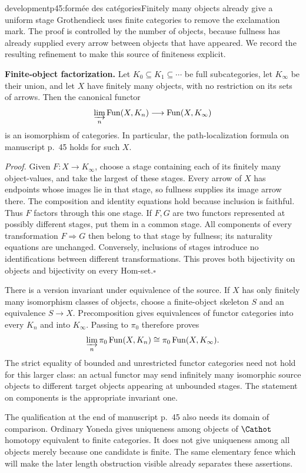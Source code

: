 \begin{dcomment}{development}{p45:formée des catégories}{Finitely many objects already give a uniform stage}
Grothendieck uses finite categories to remove the exclamation mark. The proof is controlled by the number of objects, because fullness has already supplied every arrow between objects that have appeared. We record the resulting refinement to make this source of finiteness explicit.

\textbf{Finite-object factorization.}\ours\quad
Let $K_0\subseteq K_1\subseteq\cdots$ be full subcategories, let $K_\infty$ be their union, and let $X$ have finitely many objects, with no restriction on its sets of arrows. Then the canonical functor
\[
 \varinjlim_n\operatorname{Fun}(X,K_n)
       \longrightarrow\operatorname{Fun}(X,K_\infty)
\]
is an isomorphism of categories. In particular, the path-localization formula on manuscript p.~45 holds for such $X$.

\textit{Proof.} Given $F:X\to K_\infty$, choose a stage containing each of its finitely many object-values, and take the largest of these stages. Every arrow of $X$ has endpoints whose images lie in that stage, so fullness supplies its image arrow there. The composition and identity equations hold because inclusion is faithful. Thus $F$ factors through this one stage. If $F,G$ are two functors represented at possibly different stages, put them in a common stage. All components of every transformation $F\Rightarrow G$ then belong to that stage by fullness; its naturality equations are unchanged. Conversely, inclusions of stages introduce no identifications between different transformations. This proves both bijectivity on objects and bijectivity on every Hom-set.\hfill$\square$

There is a version invariant under equivalence of the source. If $X$ has only finitely many isomorphism classes of objects, choose a finite-object skeleton $S$ and an equivalence $S\to X$. Precomposition gives equivalences of functor categories into every $K_n$ and into $K_\infty$. Passing to $\pi_0$ therefore proves
\[
 \varinjlim_n\pi_0\operatorname{Fun}(X,K_n)
       \cong\pi_0\operatorname{Fun}(X,K_\infty).
\]
The strict equality of bounded and unrestricted functor categories need not hold for this larger class: an actual functor may send infinitely many isomorphic source objects to different target objects appearing at unbounded stages. The statement on components is the appropriate invariant one.

The qualification at the end of manuscript p.~45 also needs its domain of comparison. Ordinary Yoneda gives uniqueness among objects of $\Cathot$ homotopy equivalent to finite categories. It does not give uniqueness among all objects merely because one candidate is finite. The same elementary fence which will make the later length obstruction visible already separates these assertions.


\end{dcomment}
